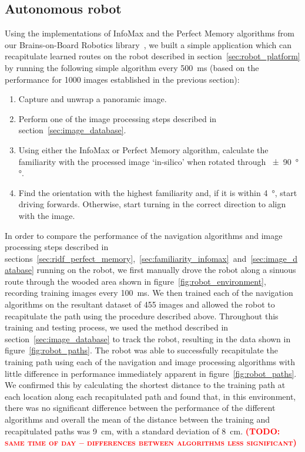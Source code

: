 \documentclass[letterpaper]{article}
\newcommand{\todo}[1]{\textbf{\textsc{\textcolor{red}{(TODO: #1)}}}}
\begin{document}
\subsection{Autonomous robot}
Using the implementations of InfoMax and the Perfect Memory algorithms from our Brains-on-Board Robotics library~\citep{Dewar2017}, we built a simple application which can recapitulate learned routes on the robot described in section~\ref{sec:robot_platform} by running the following simple algorithm every \SI{500}{\milli\second} (based on the performance for 1000 images established in the previous section):
%
\begin{enumerate}
    \item Capture and unwrap a panoramic image.
    \item Perform one of the image processing steps described in section~\ref{sec:image_database}.
    \item Using either the InfoMax or Perfect Memory algorithm, calculate the familiarity with the processed image ‘in-silico’ when rotated through \SI{\pm 90}{\degree}°.
    \item Find the orientation with the highest familiarity and, if it is within \SI{4}{\degree}, start driving forwards. Otherwise, start turning in the correct direction to align with the image.
\end{enumerate}
%
In order to compare the performance of the navigation algorithms and image processing steps described in sections~\ref{sec:ridf_perfect_memory},~\ref{sec:familiarity_infomax}~and~\ref{sec:image_database} running on the robot, we first manually drove the robot along a sinuous route through the wooded area shown in figure~\ref{fig:robot_environment}, recording training images every \SI{100}{\milli\second}.
We then trained each of the navigation algorithms on the resultant dataset of \num{455} images and allowed the robot to recapitulate the path using the procedure described above.
Throughout this training and testing process, we used the method described in section~\ref{sec:image_database} to track the robot, resulting in the data shown in figure~\ref{fig:robot_paths}.
The robot was able to successfully recapitulate the training path using each of the navigation and image processing algorithms with little difference in performance immediately apparent in figure~\ref{fig:robot_paths}.
We confirmed this by calculating the shortest distance to the training path at each location along each recapitulated path and found that, in this environment, there was no significant difference between the performance of the different algorithms and overall the mean of the distance between the training and recapitulated paths was \SI{9}{\centi\metre}, with a standard deviation of \SI{8}{\centi\metre}.
\todo{same time of day -- differences between algorithms less significant}
\end{document}
